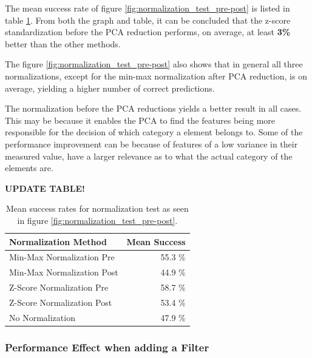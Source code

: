 The mean success rate of figure \ref{fig:normalization_test_pre-post} is listed in table \ref{tab:meanSuccess_normalization_test_pre-post}.
From both the graph and table, it can be concluded that the z-score standardization before the PCA reduction performs, on average, at least \textbf{3\%} better than the other methods.

The figure \ref{fig:normalization_test_pre-post} also shows that in general all three normalizations, except for the min-max normalization after PCA reduction, is on average, yielding a higher number of correct predictions.

The normalization before the PCA reductions yields a better result in all cases. 
This may be because it enables the PCA to find the features being more responsible for the decision of which category a element belongs to. 
Some of the performance improvement can be because of features of a low variance in their measured value, have a larger relevance as to what the actual category of the elements are.

\textbf{UPDATE TABLE!}

\begin{table}[H]
\centering
\begin{tabular}{|l|r|}\hline
Normalization Method & Mean Success \\ \hline
Min-Max Normalization Pre & 55.3 \% \\ \hline
Min-Max Normalization Post & 44.9 \% \\ \hline
Z-Score Normalization Pre & 58.7 \% \\ \hline
Z-Score Normalization Post & 53.4  \% \\ \hline
No Normalization & 47.9 \% \\ \hline
\end{tabular}
\caption{Mean success rates for normalization test as seen in figure \ref{fig:normalization_test_pre-post}.}
\label{tab:meanSuccess_normalization_test_pre-post}
\end{table}



\subsubsection{Performance Effect when adding a Filter}

